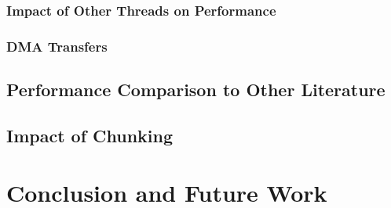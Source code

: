 \documentclass[final]{cmpreport}
\begin{document}

\subsubsection{Impact of Other Threads on Performance}


\subsubsection{DMA Transfers}


\subsection{Performance Comparison to Other Literature}

\subsection{Impact of Chunking}

\section{Conclusion and Future Work}
\end{document}
